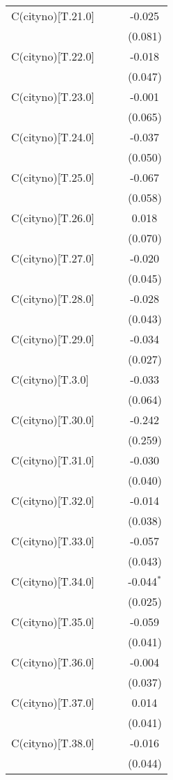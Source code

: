 \begin{table}[!htbp]
\begin{tabular}{@{\extracolsep{5pt}}lccc}
 C(cityno)[T.21.0] & & & -0.025$^{}$ \\
& & & (0.081) \\
 C(cityno)[T.22.0] & & & -0.018$^{}$ \\
& & & (0.047) \\
 C(cityno)[T.23.0] & & & -0.001$^{}$ \\
& & & (0.065) \\
 C(cityno)[T.24.0] & & & -0.037$^{}$ \\
& & & (0.050) \\
 C(cityno)[T.25.0] & & & -0.067$^{}$ \\
& & & (0.058) \\
 C(cityno)[T.26.0] & & & 0.018$^{}$ \\
& & & (0.070) \\
 C(cityno)[T.27.0] & & & -0.020$^{}$ \\
& & & (0.045) \\
 C(cityno)[T.28.0] & & & -0.028$^{}$ \\
& & & (0.043) \\
 C(cityno)[T.29.0] & & & -0.034$^{}$ \\
& & & (0.027) \\
 C(cityno)[T.3.0] & & & -0.033$^{}$ \\
& & & (0.064) \\
 C(cityno)[T.30.0] & & & -0.242$^{}$ \\
& & & (0.259) \\
 C(cityno)[T.31.0] & & & -0.030$^{}$ \\
& & & (0.040) \\
 C(cityno)[T.32.0] & & & -0.014$^{}$ \\
& & & (0.038) \\
 C(cityno)[T.33.0] & & & -0.057$^{}$ \\
& & & (0.043) \\
 C(cityno)[T.34.0] & & & -0.044$^{*}$ \\
& & & (0.025) \\
 C(cityno)[T.35.0] & & & -0.059$^{}$ \\
& & & (0.041) \\
 C(cityno)[T.36.0] & & & -0.004$^{}$ \\
& & & (0.037) \\
 C(cityno)[T.37.0] & & & 0.014$^{}$ \\
& & & (0.041) \\
 C(cityno)[T.38.0] & & & -0.016$^{}$ \\
& & & (0.044) \\

\end{tabular}
\end{table}

